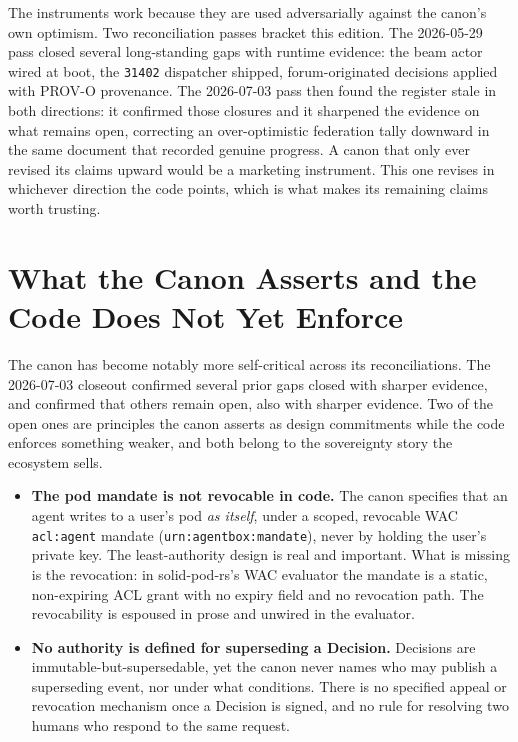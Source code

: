 The instruments work because they are used adversarially against the canon's own optimism. Two reconciliation passes bracket this edition. The 2026-05-29 pass closed several long-standing gaps with runtime evidence: the beam actor wired at boot, the \texttt{31402} dispatcher shipped, forum-originated decisions applied with PROV-O provenance. The 2026-07-03 pass then found the register stale in both directions: it confirmed those closures and it sharpened the evidence on what remains open, correcting an over-optimistic federation tally downward in the same document that recorded genuine progress. A canon that only ever revised its claims upward would be a marketing instrument. This one revises in whichever direction the code points, which is what makes its remaining claims worth trusting.

\section{What the Canon Asserts and the Code Does Not Yet Enforce}

The canon has become notably more self-critical across its reconciliations. The 2026-07-03 closeout confirmed several prior gaps closed with sharper evidence, and confirmed that others remain open, also with sharper evidence. Two of the open ones are principles the canon asserts as design commitments while the code enforces something weaker, and both belong to the sovereignty story the ecosystem sells.

\begin{cautionbox}[title={Two principles the canon states but the code does not yet enforce}]
\begin{itemize}
  \item \textbf{The pod mandate is not revocable in code.} The canon specifies that an agent writes to a user's pod \emph{as itself}, under a scoped, revocable WAC \texttt{acl:agent} mandate (\texttt{urn:agentbox:mandate}), never by holding the user's private key. The least-authority design is real and important. What is missing is the revocation: in solid-pod-rs's WAC evaluator the mandate is a static, non-expiring ACL grant with no expiry field and no revocation path. The revocability is espoused in prose and unwired in the evaluator.
  \item \textbf{No authority is defined for superseding a Decision.} Decisions are immutable-but-supersedable, yet the canon never names who may publish a superseding event, nor under what conditions. There is no specified appeal or revocation mechanism once a Decision is signed, and no rule for resolving two humans who respond to the same request.
\end{itemize}
\end{cautionbox}

